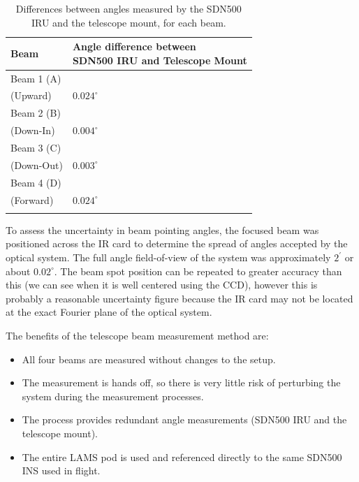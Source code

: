 \documentclass[12pt,twoside,english]{article}\usepackage[]{graphicx}\usepackage[]{color}
\providecommand{\tabularnewline}{\\}
\let\OrgIndex\index
\renewcommand*{\index}[1]{\OrgIndex{#1}}
\begin{document}
{{\begin{table}
\begin{minipage}[t]{0.93\columnwidth}%
\noindent \begin{center}
\begin{tabular}{>{\centering}p{2.5cm}>{\centering}p{7cm}}
\toprule 
\textbf{Beam}  &
\textbf{Angle difference between \\
SDN500 IRU and Telescope Mount}
\tabularnewline
\midrule
\midrule 
Beam 1 (A) &
\tabularnewline
(Upward)  &
$0.024^{\circ}$ \tabularnewline
\midrule 
Beam 2 (B) &
\tabularnewline
(Down-In)  &
$0.004^{\circ}$ \tabularnewline
\midrule 
Beam 3 (C) &
\tabularnewline
(Down-Out)  &
$0.003^{\circ}$ \tabularnewline
\midrule 
Beam 4 (D) &
\tabularnewline
(Forward)  &
$0.024^{\circ}$ \tabularnewline
\midrule 
  &
\tabularnewline
\end{tabular}
\par\end{center}%
\end{minipage}
\protect\caption{Differences between angles measured by the SDN500 IRU and the telescope mount, for each beam.\label{tab:AngleDiff}}
\end{table}

To assess the uncertainty in beam pointing angles, the focused beam was positioned across the IR card to determine the spread of angles accepted by the optical system. The full angle field-of-view of the system was approximately $2^{\prime}$ or about $0.02^{\circ}$. The beam spot position can be repeated to greater accuracy than this (we can see when it is well centered using the CCD), however this is probably a reasonable uncertainty figure because the IR card may not be located at the exact Fourier plane of the optical system.  

The benefits of the telescope beam measurement method are:  
\begin{itemize}
\item All four beams are measured without changes to the setup. 

\item The measurement is \textquotedbl{}hands off\textquotedbl{}, so there is very little risk of perturbing the system during the measurement processes. 

\item The process provides redundant angle measurements (SDN500 IRU and the telescope mount). 

\item The entire LAMS pod is used and referenced directly to the same SDN500 INS used in flight.  
\end{itemize}

}}
\end{document}
